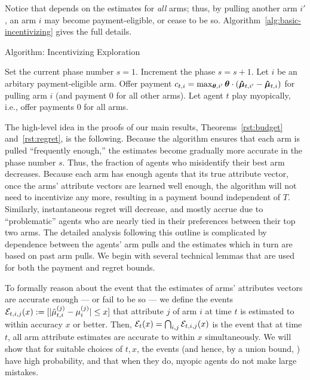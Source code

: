 Notice that  depends on the estimates for \emph{all}
arms; thus, by pulling another arm $i'$, an arm $i$ may become
payment-eligible, or cease to be so.
Algorithm~\ref{alg:basic-incentivizing} gives the full details.


\begin{algorithm}
\caption{Algorithm: Incentivizing Exploration \label{alg:basic-incentivizing}}
\begin{algorithmic}
\STATE Set the current phase number $s = 1$.
\STATE Increment the phase $s = s + 1$.
\ENDIF
{}
\STATE Let $i$ be an arbitary payment-eligible arm.
\STATE Offer payment
$c_{t,i} = \max_{\bm{\theta},i'} \bm{\theta} \cdot (\bm{\hat{\mu}}_{t,i'} - \bm{\hat{\mu}}_{t,i})$
for pulling arm $i$
(and payment 0 for all other arms).
\ELSE
\STATE Let agent $t$ play myopically, i.e., offer payments 0 for all arms.
\ENDIF
\ENDFOR
\end{algorithmic}
\end{algorithm}

The high-level idea in the proofs of our main results, Theorems~\ref{rst:budget} and~\ref{rst:regret},
is the following.
Because the algorithm ensures that each arm is pulled
``frequently enough,''
the estimates  become gradually more accurate in the
phase number $s$.
Thus, the fraction of agents who misidentify their best arm decreases.
Because each arm has enough agents that  its true attribute vector, 
once the arms' attribute vectors are learned well enough,
the algorithm will not need to incentivize any more,
resulting in a payment bound independent of $T$.
Similarly, instantaneous regret will decrease, and mostly accrue
due to ``problematic'' agents who are nearly tied in their preferences
between their top two arms.
The detailed analysis following this outline is complicated by
dependence between the agents' arm pulls and the
estimates which in turn are based on past arm pulls.
We begin with several technical lemmas that are used for both the
payment and regret bounds.

To formally reason about the event that the estimates of arms'
attributes vectors are accurate enough --- or fail to be so ---
we define the events
${\mathcal E}_{t,i,j}(x) := [|\hat{\mu}_{t,i}^{(j)} - \mu_{i}^{(j)}| \leq x]$
that attribute $j$ of arm $i$ at time $t$ is estimated to
within accuracy $x$ or better.
Then, 
${\mathcal E}_{t}(x) = \bigcap_{i,j} {\mathcal E}_{t,i,j}(x)$
is the event that at time $t$, all arm attribute
estimates are accurate to within $x$ simultaneously.
We will show that for suitable choices of $t, x$,
the events 
(and hence, by a union bound, )
have high probability,
and that when they do, myopic agents do not make large mistakes.



